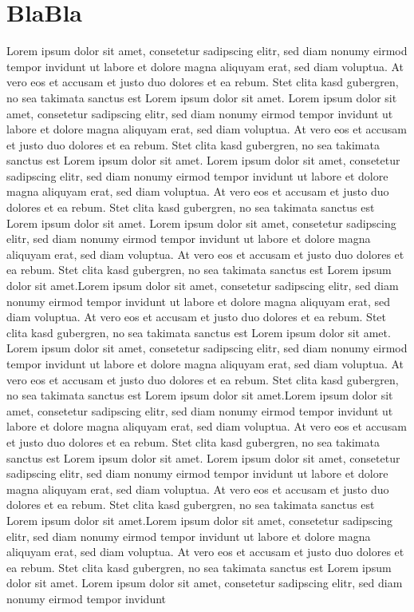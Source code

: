 \section{BlaBla}
Lorem ipsum dolor sit amet, consetetur sadipscing elitr, sed diam nonumy eirmod tempor invidunt ut labore et dolore magna aliquyam erat, sed diam voluptua. At vero eos et accusam et justo duo dolores et ea rebum. Stet clita kasd gubergren, no sea takimata sanctus est Lorem ipsum dolor sit amet. Lorem ipsum dolor sit amet, consetetur sadipscing elitr, sed diam nonumy eirmod tempor invidunt ut labore et dolore magna aliquyam erat, sed diam voluptua. At vero eos et accusam et justo duo dolores et ea rebum. Stet clita kasd gubergren, no sea takimata sanctus est Lorem ipsum dolor sit amet.\cite{einstein}
Lorem ipsum dolor sit amet, consetetur sadipscing elitr, sed diam nonumy eirmod tempor invidunt ut labore et dolore magna aliquyam erat, sed diam voluptua. At vero eos et accusam et justo duo dolores et ea rebum. Stet clita kasd gubergren, no sea takimata sanctus est Lorem ipsum dolor sit amet. Lorem ipsum dolor sit amet,\cite{knuthwebsite} consetetur sadipscing elitr, sed diam nonumy eirmod tempor invidunt ut labore et dolore magna aliquyam erat, sed diam voluptua. At vero eos et accusam et justo duo dolores et ea rebum. Stet clita kasd gubergren, no sea takimata sanctus est Lorem ipsum dolor sit amet.Lorem ipsum dolor sit amet, consetetur sadipscing elitr, sed diam nonumy eirmod tempor invidunt ut labore et dolore magna aliquyam erat, sed diam voluptua. At vero eos et accusam et justo duo dolores et ea rebum. Stet clita kasd gubergren, no sea takimata sanctus est Lorem ipsum dolor sit amet. Lorem ipsum dolor sit amet, consetetur sadipscing elitr, sed diam nonumy eirmod tempor invidunt ut labore et dolore magna aliquyam erat, sed diam voluptua. At vero eos et accusam et justo duo dolores et ea rebum. Stet clita kasd gubergren, no sea takimata sanctus est Lorem ipsum dolor sit amet.Lorem ipsum dolor sit amet, consetetur sadipscing elitr, sed diam nonumy eirmod tempor invidunt ut labore et dolore magna aliquyam erat, sed diam voluptua. At vero eos et accusam et justo duo dolores et ea rebum. Stet clita kasd gubergren, no sea takimata sanctus est Lorem ipsum dolor sit amet. Lorem ipsum dolor sit amet, consetetur sadipscing elitr, sed diam nonumy eirmod tempor invidunt ut labore et dolore magna aliquyam erat, sed diam voluptua. At vero eos et accusam et justo duo dolores et ea rebum. Stet clita kasd gubergren, no sea takimata sanctus est Lorem ipsum dolor sit amet.Lorem ipsum dolor sit amet, consetetur sadipscing elitr, sed diam nonumy eirmod tempor invidunt ut labore et dolore magna aliquyam erat, sed diam voluptua. At vero eos et accusam et justo duo dolores et ea rebum. Stet clita kasd gubergren, no sea takimata sanctus est Lorem ipsum dolor sit amet. Lorem ipsum dolor sit amet, consetetur sadipscing elitr, sed diam nonumy eirmod tempor invidunt 


